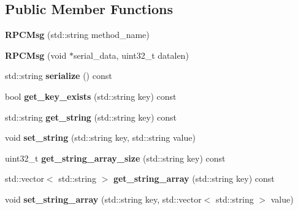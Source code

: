 \subsection*{Public Member Functions}
\begin{DoxyCompactItemize}
\item 
\hypertarget{classRPCMsg_a5b079507462d473472cbebbbb50de937}{
{\bfseries RPCMsg} (std::string method\_\-name)}
\label{classRPCMsg_a5b079507462d473472cbebbbb50de937}

\item 
\hypertarget{classRPCMsg_afd892b417dd86575b49ae3f32d806c19}{
{\bfseries RPCMsg} (void $\ast$serial\_\-data, uint32\_\-t datalen)}
\label{classRPCMsg_afd892b417dd86575b49ae3f32d806c19}

\item 
\hypertarget{classRPCMsg_af71eba6393fc6bde21b74e3216b46c4f}{
std::string {\bfseries serialize} () const }
\label{classRPCMsg_af71eba6393fc6bde21b74e3216b46c4f}

\item 
\hypertarget{classRPCMsg_aec9891e0ba56c7fc7e5148a380f8af27}{
bool {\bfseries get\_\-key\_\-exists} (std::string key) const }
\label{classRPCMsg_aec9891e0ba56c7fc7e5148a380f8af27}

\item 
\hypertarget{classRPCMsg_a294ac07dffd7cebd8719e8d783acae1e}{
std::string {\bfseries get\_\-string} (std::string key) const }
\label{classRPCMsg_a294ac07dffd7cebd8719e8d783acae1e}

\item 
\hypertarget{classRPCMsg_a3a2eece578a4be54f7b62bc1548917e4}{
void {\bfseries set\_\-string} (std::string key, std::string value)}
\label{classRPCMsg_a3a2eece578a4be54f7b62bc1548917e4}

\item 
\hypertarget{classRPCMsg_a2737637d68a7a87b4068ff53d1258893}{
uint32\_\-t {\bfseries get\_\-string\_\-array\_\-size} (std::string key) const }
\label{classRPCMsg_a2737637d68a7a87b4068ff53d1258893}

\item 
\hypertarget{classRPCMsg_ab4ec5b76220077a379f87d250994dda7}{
std::vector$<$ std::string $>$ {\bfseries get\_\-string\_\-array} (std::string key) const }
\label{classRPCMsg_ab4ec5b76220077a379f87d250994dda7}

\item 
\hypertarget{classRPCMsg_a59443e2d33d48c2403a428f3ca4db6a1}{
void {\bfseries set\_\-string\_\-array} (std::string key, std::vector$<$ std::string $>$ value)}
\label{classRPCMsg_a59443e2d33d48c2403a428f3ca4db6a1}


\end{DoxyCompactItemize}
